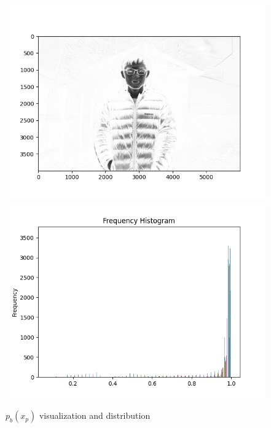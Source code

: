 \documentclass[final]{cvpr}
\begin{document}
\begin{figure}[ht]
   \centering
   \includegraphics[scale=0.5]{../data/output/p.png}
   \includegraphics[scale=0.5]{../data/output/p_distr.png}
   \caption{$p_b(x_p)$ visualization and distribution}
\end{figure}
\end{document}
